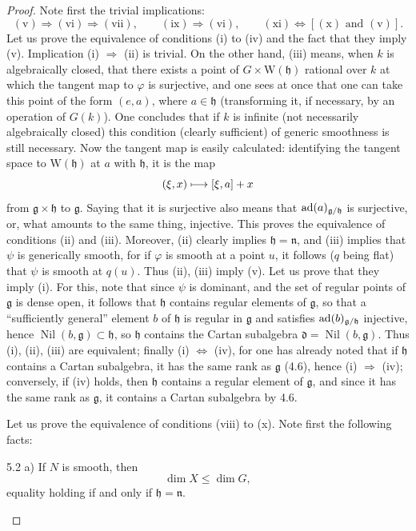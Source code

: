 \begin{proof}
Note first the trivial implications:
\[
 (\mathrm{v})\Rightarrow(\mathrm{vi})\Rightarrow(\mathrm{vii}),\qquad
 (\mathrm{ix})\Rightarrow(\mathrm{vi}),\qquad
 (\mathrm{xi})\Leftrightarrow[(\mathrm{x})\text{ and }(\mathrm{v})].
\]
Let us prove the equivalence of conditions (i) to (iv) and the fact
that they imply (v). Implication (i) $\Rightarrow$ (ii) is trivial.
On the other hand, (iii) means, when $k$ is algebraically closed,
that there exists a point of $G\times\mathrm W(\mathfrak h)$ rational
over $k$ at which the tangent map to $\varphi$ is surjective, and one
sees at once that one can take this point of the form $(e,a)$,
where $a\in\mathfrak h$ (transforming it, if necessary, by an
operation of $G(k)$). One concludes that if $k$ is infinite (not
necessarily algebraically closed) this condition (clearly sufficient)
of generic smoothness is still necessary. Now the tangent map is
easily calculated: identifying the tangent space to
$\mathrm W(\mathfrak h)$ at $a$ with $\mathfrak h$, it is the map
\[
 (\xi,x)\longmapsto[\xi,a]+x
\]
from $\mathfrak g\times\mathfrak h$ to $\mathfrak g$. Saying that it
is surjective also means that $\operatorname{ad}(a)_{\mathfrak g/\mathfrak h}$ is
surjective, or, what amounts to the same thing, injective. This
proves the equivalence of conditions (ii) and (iii). Moreover,
(ii) clearly implies $\mathfrak h=\mathfrak n$, and (iii) implies
that $\psi$ is generically smooth, for if $\varphi$ is smooth at a
point $u$, it follows ($q$ being flat) that $\psi$ is smooth at
$q(u)$. Thus (ii), (iii) imply (v). Let us prove that they imply
(i). For this, note that since $\psi$ is dominant, and the set of
regular points of $\mathfrak g$ is dense open, it follows that
$\mathfrak h$ contains regular elements of $\mathfrak g$, so that
a ``sufficiently general'' element $b$ of $\mathfrak h$ is regular
in $\mathfrak g$ and satisfies $\operatorname{ad}(b)_{\mathfrak g/\mathfrak h}$
injective, hence $\operatorname{Nil}(b,\mathfrak g)\subset\mathfrak h$,
so $\mathfrak h$ contains the Cartan subalgebra
$\mathfrak d=\operatorname{Nil}(b,\mathfrak g)$. Thus (i), (ii), (iii)
are equivalent; finally (i) $\Leftrightarrow$ (iv), for one has
already noted that if $\mathfrak h$ contains a Cartan subalgebra,
it has the same rank as $\mathfrak g$ (4.6), hence (i)
$\Rightarrow$ (iv); conversely, if (iv) holds, then $\mathfrak h$
contains a regular element of $\mathfrak g$, and since it has the
same rank as $\mathfrak g$, it contains a Cartan subalgebra by 4.6.

Let us prove the equivalence of conditions (viii) to (x). Note
first the following facts:
\begin{lemma}{5.2}\label{XIII.5.2}
\noindent a) If $N$ is smooth, then
\[
 \dim X\leq\dim G,
\]
equality holding if and only if $\mathfrak h=\mathfrak n$.


\end{lemma}
\end{proof}
